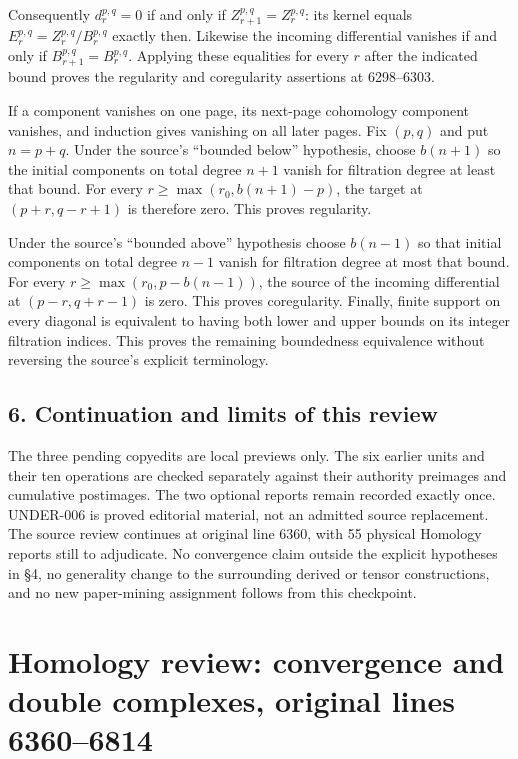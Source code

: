 \documentclass[11pt]{article}
\begin{document}
Consequently \(d_r^{p,q}=0\) if and only if \(Z_{r+1}^{p,q}=Z_r^{p,q}\): its kernel equals \(E_r^{p,q}=Z_r^{p,q}/B_r^{p,q}\) exactly then. Likewise the incoming differential vanishes if and only if \(B_{r+1}^{p,q}=B_r^{p,q}\). Applying these equalities for every \(r\) after the indicated bound proves the regularity and coregularity assertions at 6298--6303.

If a component vanishes on one page, its next-page cohomology component vanishes, and induction gives vanishing on all later pages. Fix \((p,q)\) and put \(n=p+q\). Under the source's ``bounded below'' hypothesis, choose \(b(n+1)\) so the initial components on total degree \(n+1\) vanish for filtration degree at least that bound. For every \(r\geq\max(r_0,b(n+1)-p)\), the target at \((p+r,q-r+1)\) is therefore zero. This proves regularity.

Under the source's ``bounded above'' hypothesis choose \(b(n-1)\) so that initial components on total degree \(n-1\) vanish for filtration degree at most that bound. For every \(r\geq\max(r_0,p-b(n-1))\), the source of the incoming differential at \((p-r,q+r-1)\) is zero. This proves coregularity. Finally, finite support on every diagonal is equivalent to having both lower and upper bounds on its integer filtration indices. This proves the remaining boundedness equivalence without reversing the source's explicit terminology.

\subsection{6. Continuation and limits of this review}\label{note-06-continuation-and-limits-of-this-review}

The three pending copyedits are local previews only. The six earlier units and their ten operations are checked separately against their authority preimages and cumulative postimages. The two optional reports remain recorded exactly once. UNDER-006 is proved editorial material, not an admitted source replacement. The source review continues at original line 6360, with 55 physical Homology reports still to adjudicate. No convergence claim outside the explicit hypotheses in §4, no generality change to the surrounding derived or tensor constructions, and no new paper-mining assignment follows from this checkpoint.
\clearpage
\section{Homology review: convergence and double complexes, original lines 6360--6814}\label{note-07-homology-review-convergence-and-double-complexes-original-lines-63606814}
\end{document}
